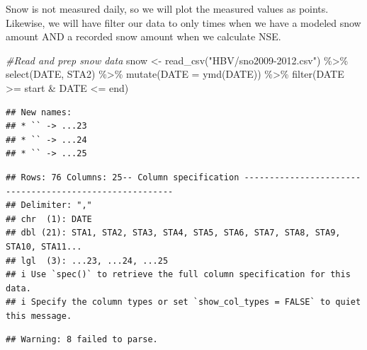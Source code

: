 \documentclass[
]{book}
\newenvironment{Shaded}{\begin{snugshade}}{\end{snugshade}}
\newcommand{\AttributeTok}[1]{\textcolor[rgb]{0.77,0.63,0.00}{#1}}
\newcommand{\CommentTok}[1]{\textcolor[rgb]{0.56,0.35,0.01}{\textit{#1}}}
\newcommand{\FunctionTok}[1]{\textcolor[rgb]{0.00,0.00,0.00}{#1}}
\newcommand{\NormalTok}[1]{#1}
\newcommand{\OtherTok}[1]{\textcolor[rgb]{0.56,0.35,0.01}{#1}}
\newcommand{\SpecialCharTok}[1]{\textcolor[rgb]{0.00,0.00,0.00}{#1}}
\newcommand{\StringTok}[1]{\textcolor[rgb]{0.31,0.60,0.02}{#1}}
\begin{document}
Snow is not measured daily, so we will plot the measured values as points. Likewise, we will have filter our data to only times when we have a modeled snow amount AND a recorded snow amount when we calculate NSE.

\begin{Shaded}
\begin{Highlighting}[]
\CommentTok{\#Read and prep snow data}
\NormalTok{snow }\OtherTok{\textless{}{-}} \FunctionTok{read\_csv}\NormalTok{(}\StringTok{"HBV/sno2009{-}2012.csv"}\NormalTok{) }\SpecialCharTok{\%\textgreater{}\%}
         \FunctionTok{select}\NormalTok{(DATE, STA2) }\SpecialCharTok{\%\textgreater{}\%}
         \FunctionTok{mutate}\NormalTok{(}\AttributeTok{DATE =} \FunctionTok{ymd}\NormalTok{(DATE)) }\SpecialCharTok{\%\textgreater{}\%}
         \FunctionTok{filter}\NormalTok{(DATE }\SpecialCharTok{\textgreater{}=}\NormalTok{ start }\SpecialCharTok{\&}\NormalTok{ DATE }\SpecialCharTok{\textless{}=}\NormalTok{ end)}
\end{Highlighting}
\end{Shaded}

\begin{verbatim}
## New names:
## * `` -> ...23
## * `` -> ...24
## * `` -> ...25
\end{verbatim}

\begin{verbatim}
## Rows: 76 Columns: 25-- Column specification --------------------------------------------------------
## Delimiter: ","
## chr  (1): DATE
## dbl (21): STA1, STA2, STA3, STA4, STA5, STA6, STA7, STA8, STA9, STA10, STA11...
## lgl  (3): ...23, ...24, ...25
## i Use `spec()` to retrieve the full column specification for this data.
## i Specify the column types or set `show_col_types = FALSE` to quiet this message.
\end{verbatim}

\begin{verbatim}
## Warning: 8 failed to parse.
\end{verbatim}
\end{document}
